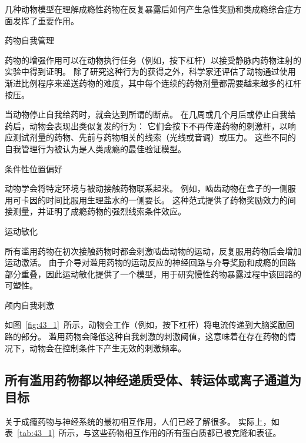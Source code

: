 \begin{proposition}[药物成瘾的动物模型] \label{box:43_1}
	
	\quad \quad 几种动物模型在理解成瘾性药物在反复暴露后如何产生急性奖励和类成瘾综合症方面发挥了重要作用。
	
	\quad \quad 药物自我管理
	
	\quad \quad 药物的增强作用可以在动物执行任务（例如，按下杠杆）以接受静脉内药物注射的实验中得到证明。
	除了研究这种行为的获得之外，科学家还评估了动物通过使用渐进比例程序来递送药物的难度，其中每个连续的药物剂量都需要越来越多的杠杆按压。
	
	\quad \quad 当动物停止自我给药时，就会达到所谓的断点。
	在几周或几个月后或停止自我给药后，动物会表现出类似复发的行为：
	它们会按下不再传递药物的刺激杆，以响应测试剂量的药物、先前与药物相关的线索（光线或音调）或压力。
	这些不同的自我管理行为被认为是人类成瘾的最佳验证模型。
	
	\quad \quad 条件性位置偏好
	
	\quad \quad 动物学会将特定环境与被动接触药物联系起来。
	例如，啮齿动物在盒子的一侧服用可卡因的时间比服用生理盐水的一侧要长。
	这种范式提供了药物奖励效力的间接测量，并证明了成瘾药物的强烈线索条件效应。
	
	\quad \quad 运动敏化
	
	\quad \quad 所有滥用药物在初次接触药物时都会刺激啮齿动物的运动，反复服用药物后会增加运动激活。
	由于介导对滥用药物的运动反应的神经回路与介导奖励和成瘾的回路部分重叠，因此运动敏化提供了一个模型，用于研究慢性药物暴露过程中该回路的可塑性。
	
	\quad \quad 颅内自我刺激
	
	\quad \quad 如图~\ref{fig:43_1}~所示，动物会工作（例如，按下杠杆）将电流传递到大脑奖励回路的部分。
	滥用药物会降低这种自我刺激的刺激阈值，这意味着在存在药物的情况下，动物会在控制条件下产生无效的刺激频率。
	
\end{proposition}



\subsection{所有滥用药物都以神经递质受体、转运体或离子通道为目标}

关于成瘾药物与神经系统的最初相互作用，人们已经了解很多。
实际上，如表~\ref{tab:43_1}~所示，与这些药物相互作用的所有蛋白质都已被克隆和表征。


